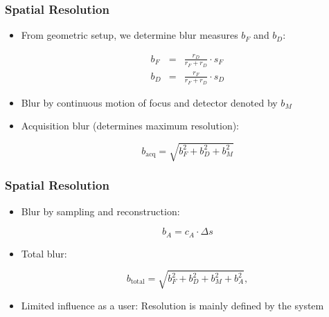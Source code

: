 \begin{frame}
	\frametitle{Spatial Resolution}

	\begin{itemize}
		\setlength\itemsep{0.3cm}
		\item From geometric setup, we determine blur measures $b_F$ and $b_D$:

		      \begin{eqnarray}
			      b_F &=& \frac{r_D}{r_F+r_D}\cdot s_F\\
			      b_D &=& \frac{r_F}{r_F+r_D}\cdot s_D
		      \end{eqnarray}

		\item Blur by continuous motion of focus and detector denoted by $b_M$
		\item Acquisition blur (determines maximum resolution):

		      \begin{equation}
			      b_{\textrm{acq}} = \sqrt{b_F^2+b_D^2+b_M^2}
		      \end{equation}

	\end{itemize}

\end{frame}

\begin{frame}
	\frametitle{Spatial Resolution}

	\begin{itemize}
		\setlength\itemsep{0.3cm}
		\item Blur by sampling and reconstruction:

		      \begin{equation}
			      b_A = c_A \cdot \Delta s
		      \end{equation}


		\item Total blur:

		      \begin{equation}
			      b_{\textrm{total}} = \sqrt{b_F^2+b_D^2+b_M^2+b_A^2},
		      \end{equation}

		\item Limited influence as a user: Resolution is mainly defined by the system

	\end{itemize}

\end{frame}

